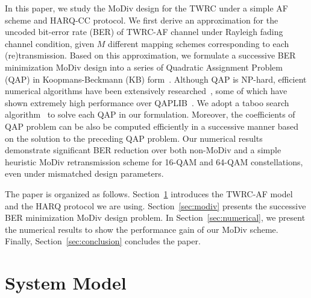 \documentclass[journal]{IEEEtran}
\begin{document}
In this paper, we study the MoDiv design for the TWRC under a simple AF scheme
and HARQ-CC protocol. We first derive an approximation for the uncoded bit-error
rate (BER) of TWRC-AF channel under Rayleigh fading channel condition, given $M$
different mapping schemes corresponding to each (re)transmission. Based on this
approximation, we formulate a successive BER minimization MoDiv design into a
series of Quadratic Assignment Problem (QAP) in Koopmans-Beckmann (KB)
form~\cite{koopmans1957assignment}. Although QAP is NP-hard, efficient numerical
algorithms have been extensively researched~\cite{benlic2015memetic}, some of
which have shown extremely high performance over
QAPLIB~\cite{burkard1997qaplib}. We adopt a taboo search
algorithm~\cite{taillard1991robust} to solve each QAP in our formulation. Moreover, the coefficients of QAP problem can be also be computed efficiently in a
successive manner based on the solution to the preceding QAP problem. Our
numerical results demonstrate significant BER reduction over both non-MoDiv and
a simple heuristic MoDiv retransmission scheme for 16-QAM and 64-QAM
constellations, even under mismatched design parameters.

The paper is organized as follows. Section~\ref{sec:model} introduces the
TWRC-AF model and the HARQ protocol we are using. Section~\ref{sec:modiv}
presents the successive BER minimization MoDiv design problem. In
Section~\ref{sec:numerical}, we present the numerical results to show the
performance gain of our MoDiv scheme. Finally, Section~\ref{sec:conclusion}
concludes the paper.



\section{System Model}
\label{sec:model}
\end{document}
